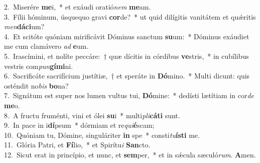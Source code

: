 {2.~}Miserére \textbf{me}i,~* et exáudi oratió\textit{nem} \textbf{me}am.\\
{3.~}Fílii hóminum, úsquequo gravi \textbf{cor}de?~* ut quid dilígitis vanitátem et quǽritis \textit{men}\textbf{dá}\textbf{ci}um?\\
{4.~}Et scitóte quóniam mirificávit Dóminus sanctum \textbf{su}um:~* Dóminus exáudiet me cum clamávero \textit{ad} \textbf{e}um.\\
{5.~}Irascímini, et nolíte peccáre:~† quæ dícitis in córdibus \textbf{ve}stris,~* in cubílibus vestris com\textit{pun}\textbf{gí}\textbf{mi}ni.\\
{6.~}Sacrificáte sacrifícium justítiæ,~† et speráte in \textbf{Dó}mino.~* Multi dicunt: quis osténdit no\textit{bis} \textbf{bo}na?\\
{7.~}Signátum est super nos lumen vultus tui, \textbf{Dó}mine:~* dedísti lætítiam in cor\textit{de} \textbf{me}o.\\
{8.~}A fructu fruménti, vini et ólei \textbf{su}i~* multi\textit{pli}\textbf{cá}\textbf{ti} sunt.\\
{9.~}In pace in i\textbf{dí}psum~* dórmiam et re\textit{qui}\textbf{é}scam;\\
{10.~}Quóniam tu, Dómine, singuláriter \textbf{in} spe~* consti\textit{tu}\textbf{í}\textbf{sti} me.\\
{11.~}Glória Patri, et \textbf{Fí}lio,~* et Spirítu\textit{i} \textbf{San}cto.\\
{12.~}Sicut erat in princípio, et nunc, et \textbf{sem}per,~* et in sǽcula sæculó\textit{rum}. \textbf{A}men.\\
